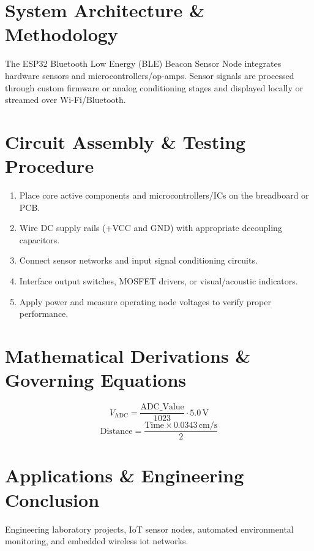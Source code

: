 \documentclass[11pt,a4paper]{article}
\begin{document}
\section{System Architecture \& Methodology}
The ESP32 Bluetooth Low Energy (BLE) Beacon Sensor Node integrates hardware sensors and microcontrollers/op-amps. Sensor signals are processed through custom firmware or analog conditioning stages and displayed locally or streamed over Wi-Fi/Bluetooth.

\section{Circuit Assembly \& Testing Procedure}
\begin{enumerate}
    \item Place core active components and microcontrollers/ICs on the breadboard or PCB.
    \item Wire DC supply rails (+VCC and GND) with appropriate decoupling capacitors.
    \item Connect sensor networks and input signal conditioning circuits.
    \item Interface output switches, MOSFET drivers, or visual/acoustic indicators.
    \item Apply power and measure operating node voltages to verify proper performance.
\end{enumerate}

\section{Mathematical Derivations \& Governing Equations}
\begin{equation}
V_{\text{ADC}} = \frac{\text{ADC\_Value}}{1023} \cdot 5.0\,\text{V}
\end{equation}
\begin{equation}
\text{Distance} = \frac{\text{Time} \times 0.0343\,\text{cm/s}}{2}
\end{equation}

\section{Applications \& Engineering Conclusion}
Engineering laboratory projects, IoT sensor nodes, automated environmental monitoring, and embedded wireless iot networks.
\end{document}
